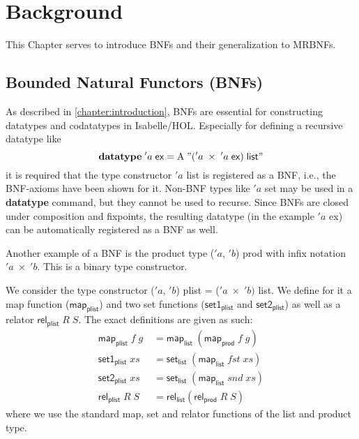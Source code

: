 
\chapter{Background}
\label{chapter:background}

  This Chapter serves to introduce \acp{BNF} and their generalization to \acp{MRBNF}. 
  \section{Bounded Natural Functors (BNFs)}
    As described in \autoref{chapter:introduction}, \acp{BNF} are essential for constructing datatypes and codatatypes in Isabelle/HOL. Especially for defining a recursive datatype like 
    \begin{equation*}
      \textbf{datatype}\; 'a\; \textsf{ex} = \text{A}\; "('a\; \times\; 'a\; \textsf{ex})\; \textsf{list}"
    \end{equation*}
    it is required that the type constructor \textsf{$'a$ list} is registered as a \ac{BNF}, i.e., the \ac{BNF}-axioms have been shown for it. Non-\ac{BNF} types like \textsf{$'a$ set} may be used in a \textbf{datatype} command, but they cannot be used to recurse. Since \acp{BNF} are closed under composition and fixpoints, the resulting datatype (in the example \textsf{$'a$ ex}) can be automatically registered as a \ac{BNF} as well.

    Another example of a \ac{BNF} is the product type \textsf{($'a$, $'b$) prod} with infix notation \textsf{$'a\; \times\; 'b$}. This is a binary type constructor.
    
    We consider the type constructor \textsf{($'a$, $'b$) plist} = \textsf{($'a\; \times\; 'b)$ list}. We define for it a map function ($\textsf{map}_\textsf{plist}$) and two set functions ($\textsf{set1}_\textsf{plist}$ and $\textsf{set2}_\textsf{plist}$) as well as a relator $\textsf{rel}_\textsf{plist}\; R\; S$. The exact definitions are given as such:
    \begin{align*}
      \textsf{map}_\textsf{plist}\; f\; g\; &= \textsf{map}_\textsf{list}\; (\textsf{map}_\textsf{prod}\; f\; g)\\
      \textsf{set1}_\textsf{plist}\; xs &= \textsf{set}_\textsf{list}\; (\textsf{map}_\textsf{list}\; fst\; xs)\\
      \textsf{set2}_\textsf{plist}\; xs &= \textsf{set}_\textsf{list}\; (\textsf{map}_\textsf{list}\; snd\; xs)\\
      \textsf{rel}_\textsf{plist}\; R\; S &= \textsf{rel}_\textsf{list} (\textsf{rel}_\textsf{prod}\; R\; S)
    \end{align*}
    \noindent where we use the standard map, set and relator functions of the list and product type.

